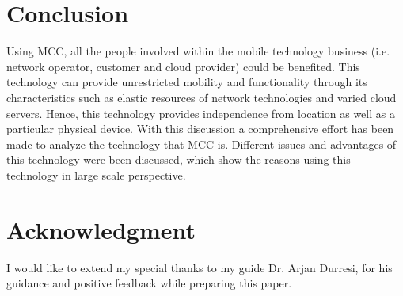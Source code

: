 \documentclass[10pt, conference, compsocconf]{IEEEtran}
\begin{document}
\section{Conclusion}
Using MCC, all the people involved within the mobile technology business (i.e. network operator, customer and cloud provider) could be benefited. This technology can provide unrestricted mobility and functionality through its characteristics such as elastic resources of network technologies and varied cloud servers.  Hence, this technology provides independence from location as well as a particular physical device. With this discussion a comprehensive effort has been made to analyze the technology that MCC is. Different issues and advantages of this technology were been discussed, which show the reasons using this technology in large scale perspective.



\section*{Acknowledgment}
I would like to extend my special thanks to my guide Dr. Arjan Durresi, for his guidance and positive feedback while preparing this paper.


\end{document}
